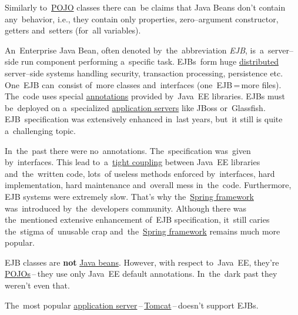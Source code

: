 \warning Similarly to~\hyperref[pojo]{POJO} classes there can~be claims that Java Beans don't contain any~behavior, i.e., they contain only properties, zero--argument constructor, getters and~setters (for~all variables).

\label{enterprisejavabeans}
An~Enterprise Java Bean, often denoted by~the~abbreviation \textit{EJB}, is~a~server--side run component performing a~specific task. EJBs~form huge \hyperref[distributedsystem]{distributed} server--side systems handling security, transaction processing, persistence etc. One~EJB can~consist of~more classes and~interfaces (one~EJB\,=\,more files). The~code uses special \hyperref[annotation]{annotations} provided by~Java~EE libraries. EJBs must be~deployed on a~specialized \hyperref[applicationserver]{application servers} like JBoss or~Glassfish. EJB~specification was extensively enhanced in~last years, but~it still is quite a~challenging topic.

In~the~past there were no~annotations. The~specification was~given by~interfaces. This lead to~a~\hyperref[loosetightcoupling]{tight coupling} between Java~EE libraries and~the~written code, lots~of useless methods enforced by~interfaces, hard implementation, hard maintenance and~overall mess in~the~code. Furthermore, EJB systems were extremely slow. That's why the~\hyperref[springframework]{Spring framework} was~introduced by~the~developers community. Although there was the~mentioned extensive enhancement of~EJB specification, it~still caries the~stigma of~unusable crap and~the~\hyperref[springframework]{Spring framework} remains much more popular.

\warning EJB classes are \textbf{not} \hyperref[javabeans]{Java beans}. However, with respect to~Java~EE, they're \hyperref[pojo]{POJOs}\,--\,they use only Java~EE default annotations. In~the~dark past they weren't even that.

\warning The~most popular \hyperref[applicationserver]{application server}\,--\,\hyperref[tomcat]{Tomcat}\,--\,doesn't support EJBs.



\label{classpath}

\label{classloaders}

